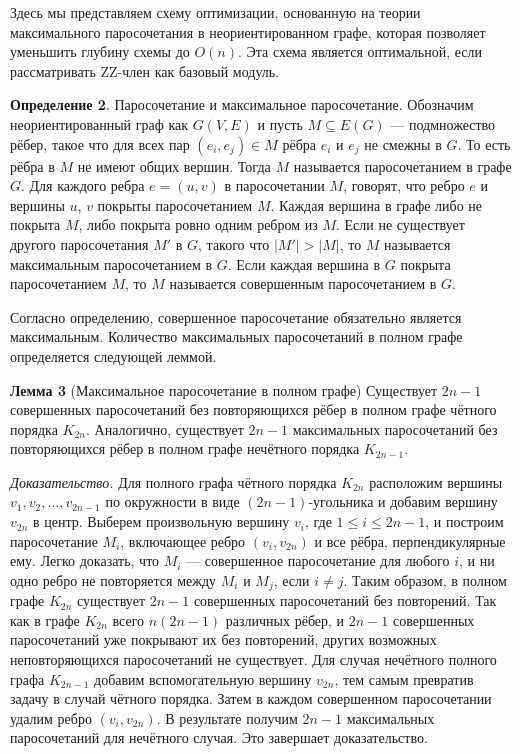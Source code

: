 Здесь мы представляем схему оптимизации, основанную на теории максимального
паросочетания в неориентированном графе, которая позволяет уменьшить глубину
схемы до $O(n)$. Эта схема является оптимальной, если рассматривать ZZ-член как
базовый модуль.

\textbf{Определение 2}. Паросочетание и максимальное паросочетание. Обозначим
неориентированный граф как $G(V, E)$ и пусть $M \subseteq E(G)$ — подмножество
рёбер, такое что для всех пар $(e_i, e_j) \in M$ рёбра $e_i$ и $e_j$ не смежны
в $G$. То есть рёбра в $M$ не имеют общих вершин. Тогда $M$ называется
паросочетанием в графе $G$. Для каждого ребра $e = (u, v)$ в паросочетании $M$,
говорят, что ребро $e$ и вершины $u$, $v$ покрыты паросочетанием $M$. Каждая
вершина в графе либо не покрыта $M$, либо покрыта ровно одним ребром из $M$.
Если не существует другого паросочетания $M'$ в $G$, такого что $|M'| > |M|$,
то $M$ называется максимальным паросочетанием в $G$. Если каждая вершина в $G$
покрыта паросочетанием $M$, то $M$ называется совершенным паросочетанием в $G$.

Согласно определению, совершенное паросочетание обязательно является
максимальным. Количество максимальных паросочетаний в полном графе определяется
следующей леммой.

\textbf{Лемма 3} (Максимальное паросочетание в полном графе) Существует $2n -
1$ совершенных паросочетаний без повторяющихся рёбер в полном графе чётного
порядка $K_{2n}$. Аналогично, существует $2n - 1$ максимальных паросочетаний
без повторяющихся рёбер в полном графе нечётного порядка $K_{2n - 1}$.

\textit{Доказательство.} Для полного графа чётного порядка $K_{2n}$ расположим
вершины $v_1, v_2, \dots, v_{2n-1}$ по окружности в виде $(2n - 1)$‑угольника и
добавим вершину $v_{2n}$ в центр. Выберем произвольную вершину $v_i$, где $1
\leq i \leq 2n - 1$, и построим паросочетание $M_i$, включающее ребро $(v_i,
v_{2n})$ и все рёбра, перпендикулярные ему. Легко доказать, что $M_i$ —
совершенное паросочетание для любого $i$, и ни одно ребро не повторяется между
$M_i$ и $M_j$, если $i \ne j$. Таким образом, в полном графе $K_{2n}$
существует $2n - 1$ совершенных паросочетаний без повторений. Так как в графе
$K_{2n}$ всего $n(2n - 1)$ различных рёбер, и $2n - 1$ совершенных
паросочетаний уже покрывают их без повторений, других возможных неповторяющихся
паросочетаний не существует. Для случая нечётного полного графа $K_{2n - 1}$
добавим вспомогательную вершину $v_{2n}$, тем самым превратив задачу в случай
чётного порядка. Затем в каждом совершенном паросочетании удалим ребро $(v_i,
v_{2n})$. В результате получим $2n - 1$ максимальных паросочетаний для
нечётного случая. Это завершает доказательство.

